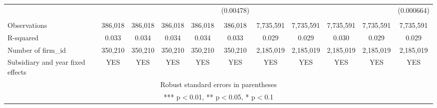 \begin{tabular}{lcccccccccc}
 &  &  &  &  & (0.00478) &  &  &  &  & (0.000664) \\
 &  &  &  &  &  &  &  &  &  &  \\
Observations & 386,018 & 386,018 & 386,018 & 386,018 & 386,018 & 7,735,591 & 7,735,591 & 7,735,591 & 7,735,591 & 7,735,591 \\
R-squared & 0.033 & 0.034 & 0.034 & 0.034 & 0.033 & 0.029 & 0.029 & 0.030 & 0.029 & 0.029 \\
Number of firm\_id & 350,210 & 350,210 & 350,210 & 350,210 & 350,210 & 2,185,019 & 2,185,019 & 2,185,019 & 2,185,019 & 2,185,019 \\
 Subsidiary and year fixed effects & YES & YES & YES & YES & YES & YES & YES & YES & YES & YES \\ \hline
\multicolumn{11}{c}{ Robust standard errors in parentheses} \\
\multicolumn{11}{c}{ *** p$<$0.01, ** p$<$0.05, * p$<$0.1} \\
\end{tabular}
